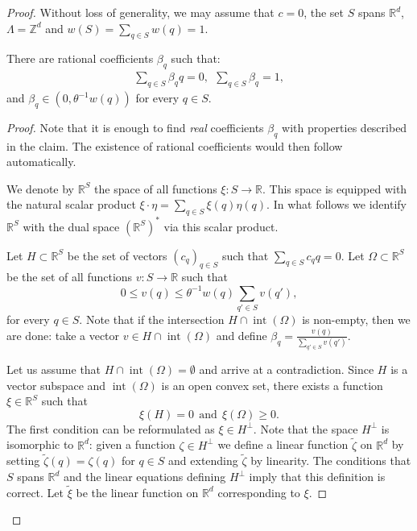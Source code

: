 \documentclass[10pt,a4paper]{amsart}
\newcommand{\R}{\mathbb R}
\newcommand{\Z}{\mathbb Z}
\renewcommand{\ge}{\geqslant}
\renewcommand{\le}{\leqslant}
\begin{document}
\begin{proof}
Without loss of generality, we may assume that $c = 0$, the set $S$ spans $\R^d$, $\Lambda = \Z^d$ and $w(S) = \sum_{q \in S} w(q) = 1$.

\begin{claim}\label{real}
There are rational coefficients $\beta_q$ such that:
\begin{align*}
    \sum_{q\in S} \beta_q q = 0,~~ \sum_{q \in S} \beta_q = 1, 
\end{align*}
and $\beta_q \in (0, \theta^{-1}w(q))$ for every $q\in S$.
\end{claim}
\begin{proof}

Note that it is enough to find {\em real} coefficients $\beta_q$ with properties described in the claim. The existence of rational coefficients would then follow automatically.

We denote by $\R^S$ the space of all functions $\xi: S \rightarrow \R$. This space is equipped with the natural scalar product $\xi \cdot \eta = \sum_{q \in S} \xi(q) \eta(q)$. In what follows we identify $\R^S$ with the dual space $(\R^S)^*$ via this scalar product.

Let $H \subset \R^S$ be the set of vectors $(c_q)_{q \in S}$ such that $\sum_{q \in S} c_q q = 0$. 
Let $\Omega \subset \R^S$ be the set of all functions $v: S \rightarrow \R$ such that 
$$
0 \le v(q) \le \theta^{-1}w(q) \sum_{q' \in S} v(q'),
$$
for every $q \in S$. Note that if the intersection $H \cap \operatorname{int}(\Omega)$ is non-empty, then we are done: take a vector $v \in H \cap \operatorname{int}(\Omega)$ and define $\beta_q = \frac{v(q)}{\sum_{q' \in S} v(q')}$.

Let us assume that $H \cap \operatorname{int}(\Omega) = \emptyset$ and arrive at a contradiction. Since $H$ is a vector subspace and $\operatorname{int}(\Omega)$ is an open convex set, there exists a function $\xi \in \R^S$ such that  
$$
\xi(H) = 0 ~~ {\text{and}} ~~\xi(\Omega) \ge 0.
$$
The first condition can be reformulated as $\xi \in H^\bot$.
Note that the space $H^\bot$ is isomorphic to $\R^d$: given a function $\zeta \in H^\bot$ we define a linear function $\tilde \zeta$ on $\R^d$ by setting $\tilde \zeta(q) = \zeta(q)$ for $q \in S$ and extending $\tilde \zeta$ by linearity. The conditions that $S$ spans $\R^d$ and the linear equations defining $H^{\bot}$ imply that this definition is correct. 
Let $\tilde \xi$ be the linear function on $\R^d$ corresponding to $\xi$.


\end{proof}
\end{proof}
\end{document}
